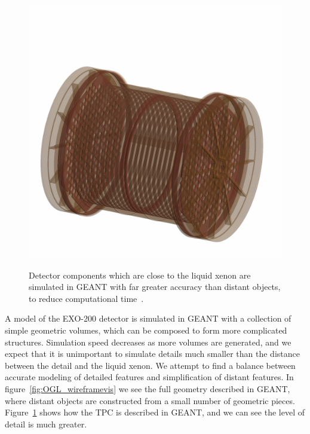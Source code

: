 \begin{figure}
\begin{center}
\includegraphics[keepaspectratio=true,width=\textwidth,clip=true,trim=20mm 30mm 35mm 125mm]{TPC_Cu_RayTracer.jpeg}
\end{center}
\renewcommand{\baselinestretch}{1}
\small\normalsize
\begin{quote}
\caption{Detector components which are close to the liquid xenon are simulated in GEANT with far greater accuracy than distant objects, to reduce computational time~\cite{MCDocumentRun2a}.}
\label{fig:RayTracer_TPConly}
\end{quote}
\end{figure}
\renewcommand{\baselinestretch}{2}
\small\normalsize

A model of the EXO-200 detector is simulated in GEANT with a collection of simple geometric volumes, which can be composed to form more complicated structures.  Simulation speed decreases as more volumes are generated, and we expect that it is unimportant to simulate details much smaller than the distance between the detail and the liquid xenon.  We attempt to find a balance between accurate modeling of detailed features and simplification of distant features.  In figure~\ref{fig:OGL_wireframevis} we see the full geometry described in GEANT, where distant objects are constructed from a small number of geometric pieces.  Figure~\ref{fig:RayTracer_TPConly} shows how the TPC is described in GEANT, and we can see the level of detail is much greater.

